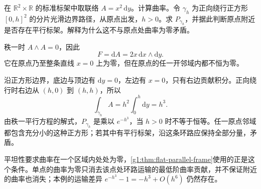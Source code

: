 \begin{exercise}\label{g1:ex:curvature-zero-at-one-point}
	在 \(\mathbb R^2\times\mathbb R\) 的标准标架中取联络 \(A=x^2\,\mathrm{d}y\)。计算曲率。令 \(\gamma_h\) 为正向绕行正方形 \([0,h]^2\) 的分片光滑边界路径，从原点出发，\(h>0\)。求 \(P_{\gamma_h}\)，并据此判断原点附近是否存在平行标架。解释为什么这不与原点处曲率为零矛盾。
\end{exercise}
\begin{solution}
	秩一时 \(A\wedge A=0\)，因此
	\[
		F=\mathrm{d}A=2x\,\mathrm{d}x\wedge\mathrm{d}y.
	\]
	它在原点乃至整条直线 \(x=0\) 上为零，但在原点的任一开邻域内都不恒为零。

	沿正方形边界，底边与顶边有 \(\mathrm{d}y=0\)，左边有 \(x=0\)，只有右边贡献积分。正向绕行时右边从 \((h,0)\) 到 \((h,h)\)，所以
	\[
		\int_{\gamma_h}A=h^2\int_0^h\mathrm{d}y=h^3.
	\]
	由秩一平行方程的解式，\(P_{\gamma_h}\) 是乘以 \(e^{-h^3}\)，当 \(h>0\) 时不等于恒等。任一原点邻域都包含充分小的这种正方形；若其中有平行标架，沿这条环路应保持全部分量，矛盾。

	平坦性要求曲率在一个区域内处处为零，\cref{g1:thm:flat-parallel-frame}使用的正是这个条件。单点的曲率为零只消去该点处环路运输的最低阶曲率贡献，并不保证附近的曲率也消失；本例的运输差异 \(e^{-h^3}-1=-h^3+O(h^6)\) 仍然存在。
\end{solution}
